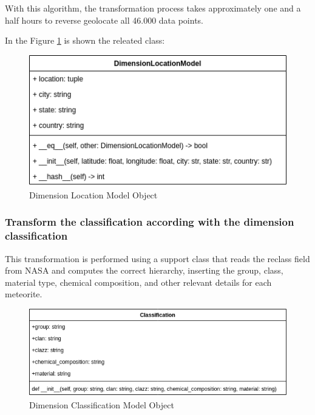\documentclass[conference]{IEEEtran}
\begin{document}
	With this algorithm, the transformation process takes approximately one and a half hours to reverse geolocate all 46.000 data points.
	
	
	In the Figure \ref{fig:DimensionLocationModel} is shown the releated class:
	\begin{figure}[htpb]
		\centering
		\includegraphics[width=\columnwidth]{images/dimension_location_model.png}
		\caption{Dimension Location Model Object}
		\label{fig:DimensionLocationModel}
	\end{figure}
	
	
	\subsubsection{Transform the classification according with the dimension classification}
	This transformation is performed using a support class that reads the reclass field from NASA and computes the correct hierarchy, inserting the group, class, material type, chemical composition, and other relevant details for each meteorite.
	\begin{figure}[htpb]
		\centering
		\includegraphics[width=\columnwidth]{images/dimension_classification.png}
		\caption{Dimension Classification Model Object}
		\label{fig: DimensionClassificationModel}
	\end{figure}
	
	
\end{document}
